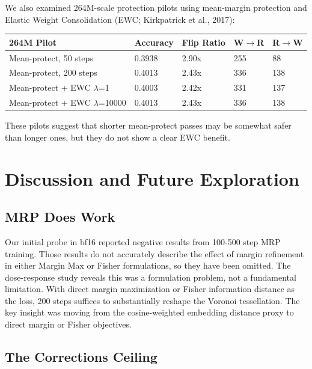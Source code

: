 \documentclass[
  11pt,
]{article}
\begin{document}
We also examined 264M-scale protection pilots using mean-margin
protection and Elastic Weight Consolidation (EWC; Kirkpatrick et al.,
2017):

\begin{longtable}[]{@{}lllll@{}}
\toprule\noalign{}
264M Pilot & Accuracy & Flip Ratio & W$\rightarrow$R & R$\rightarrow$W \\
\midrule\noalign{}
\endhead
\bottomrule\noalign{}
\endlastfoot
Mean-protect, 50 steps & 0.3938 & 2.90x & 255 & 88 \\
Mean-protect, 200 steps & 0.4013 & 2.43x & 336 & 138 \\
Mean-protect + EWC $\lambda$=1 & 0.4003 & 2.42x & 331 & 137 \\
Mean-protect + EWC $\lambda$=10000 & 0.4013 & 2.43x & 336 & 138 \\
\end{longtable}

These pilots suggest that shorter mean-protect passes may be somewhat
safer than longer ones, but they do not show a clear EWC benefit.

\hypertarget{discussion-and-future-exploration}{%
\section{Discussion and Future
Exploration}\label{discussion-and-future-exploration}}

\hypertarget{mrp-does-work}{%
\subsection{MRP Does Work}\label{mrp-does-work}}

Our initial probe in bf16 reported negative results from 100-500 step
MRP training. Those results do not accurately describe the effect of
margin refinement in either Margin Max or Fisher formulations, so they
have been omitted. The dose-response study reveals this was a
formulation problem, not a fundamental limitation. With direct margin
maximization or Fisher information distance as the loss, 200 steps
suffices to substantially reshape the Voronoi tessellation. The key
insight was moving from the cosine-weighted embedding distance proxy to
direct margin or Fisher objectives.

\hypertarget{the-corrections-ceiling}{%
\subsection{The Corrections Ceiling}\label{the-corrections-ceiling}}
\end{document}
